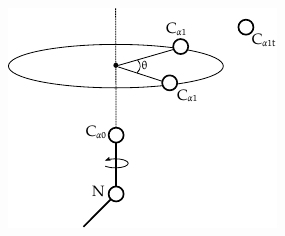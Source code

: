 





\begin{figure}
  \centering
	\includegraphics[width=0.75\columnwidth]{figures/ccd_angles}
	\label{fig:ccd_angles}
  \caption{}
\end{figure}

